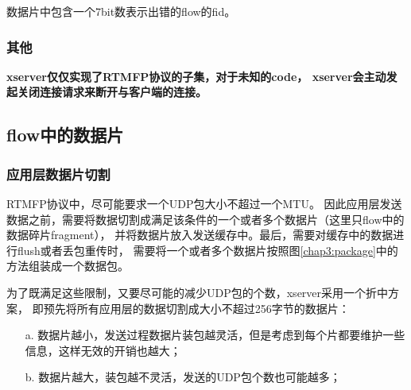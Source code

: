 数据片中包含一个7bit数表示出错的flow的fid。

\subsubsection{其他}
{\bf{xserver仅仅实现了RTMFP协议的子集，对于未知的code，
xserver会主动发起关闭连接请求来断开与客户端的连接。}}

\subsection{flow中的数据片}

\subsubsection{应用层数据片切割}
RTMFP协议中，尽可能要求一个UDP包大小不超过一个MTU。
因此应用层发送数据之前，需要将数据切割成满足该条件的一个或者多个数据片（这里只flow中的数据碎片fragment），
并将数据片放入发送缓存中。最后，需要对缓存中的数据进行flush或者丢包重传时，
需要将一个或者多个数据片按照图\ref{chap3:package}中的方法组装成一个数据包。

为了既满足这些限制，又要尽可能的减少UDP包的个数，xserver采用一个折中方案，
即预先将所有应用层的数据切割成大小不超过256字节的数据片：
\begin{itemize}
    \item [a.] 数据片越小，发送过程数据片装包越灵活，但是考虑到每个片都要维护一些信息，这样无效的开销也越大；
    \item [b.] 数据片越大，装包越不灵活，发送的UDP包个数也可能越多； 
\end{itemize}

